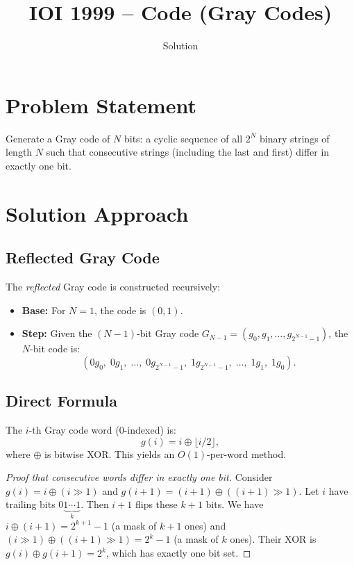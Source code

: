 \documentclass[11pt,a4paper]{article}
\title{IOI 1999 -- Code (Gray Codes)}
\author{Solution}
\date{}
\begin{document}
\maketitle

\section{Problem Statement}

Generate a Gray code of $N$ bits: a cyclic sequence of all $2^N$ binary strings of
length $N$ such that consecutive strings (including the last and first) differ in
exactly one bit.

\section{Solution Approach}

\subsection{Reflected Gray Code}

The \emph{reflected} Gray code is constructed recursively:
\begin{itemize}
  \item \textbf{Base:} For $N = 1$, the code is $(0, 1)$.
  \item \textbf{Step:} Given the $(N{-}1)$-bit Gray code $G_{N-1} = (g_0, g_1, \ldots, g_{2^{N-1}-1})$,
        the $N$-bit code is:
        \[
          (0g_0,\; 0g_1,\; \ldots,\; 0g_{2^{N-1}-1},\;
           1g_{2^{N-1}-1},\; \ldots,\; 1g_1,\; 1g_0).
        \]
\end{itemize}

\subsection{Direct Formula}

The $i$-th Gray code word (0-indexed) is:
\[
  g(i) = i \oplus \lfloor i/2 \rfloor,
\]
where $\oplus$ is bitwise XOR. This yields an $O(1)$-per-word method.

\begin{proof}[Proof that consecutive words differ in exactly one bit]
Consider $g(i) = i \oplus (i \gg 1)$ and $g(i{+}1) = (i{+}1) \oplus ((i{+}1) \gg 1)$.
Let $i$ have trailing bits $0\underbrace{1\cdots1}_k$. Then $i+1$ flips these $k{+}1$ bits.
We have $i \oplus (i{+}1) = 2^{k+1} - 1$ (a mask of $k{+}1$ ones) and
$(i \gg 1) \oplus ((i{+}1) \gg 1) = 2^k - 1$ (a mask of $k$ ones).
Their XOR is $g(i) \oplus g(i{+}1) = 2^k$, which has exactly one bit set.
\end{proof}
\end{document}
